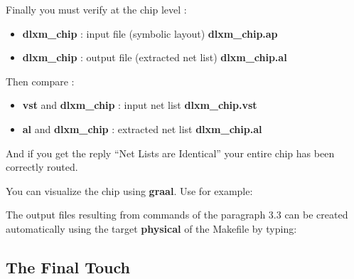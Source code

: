 Finally you must verify at the chip level :


\begin{itemize}
\item
{\bf dlxm\_chip} : input file (symbolic layout) {\bf dlxm\_chip.ap}
\item
{\bf dlxm\_chip} : output file (extracted net list) {\bf dlxm\_chip.al}
\end{itemize}


Then compare :



\begin{itemize}
\item
{\bf vst} and {\bf dlxm\_chip} : input net list {\bf dlxm\_chip.vst}
\item
{\bf al} and {\bf dlxm\_chip} : extracted net list {\bf dlxm\_chip.al}
\end{itemize}

And if you get the reply ``Net Lists are Identical'' your entire chip has been correctly routed.

You can visualize the chip using {\bf graal}. Use for example:




The output files resulting from commands of the paragraph 3.3 can be created automatically using the target {\bf physical} of the Makefile by typing:



\subsection{The Final Touch}

